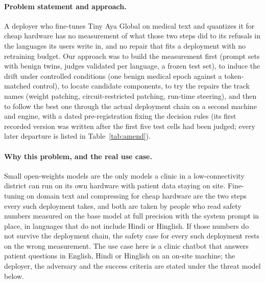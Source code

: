 \paragraph{Problem statement and approach.} A deployer who fine-tunes Tiny Aya Global on medical text and quantizes it for cheap hardware has no measurement of what those two steps did to its refusals in the languages its users write in, and no repair that fits a deployment with no retraining budget. Our approach was to build the measurement first (prompt sets with benign twins, judges validated per language, a frozen test set), to induce the drift under controlled conditions (one benign medical epoch against a token-matched control), to locate candidate components, to try the repairs the track names (weight patching, circuit-restricted patching, run-time steering), and then to follow the best one through the actual deployment chain on a second machine and engine, with a dated pre-registration fixing the decision rules (its first recorded version was written after the first five test cells had been judged; every later departure is listed in Table~\ref{tab:amend}).

\paragraph{Why this problem, and the real use case.} Small open-weights models are the only models a clinic in a low-connectivity district can run on its own hardware with patient data staying on site. Fine-tuning on domain text and compressing for cheap hardware are the two steps every such deployment takes, and both are taken by people who read safety numbers measured on the base model at full precision with the system prompt in place, in languages that do not include Hindi or Hinglish. If those numbers do not survive the deployment chain, the safety case for every such deployment rests on the wrong measurement. The use case here is a clinic chatbot that answers patient questions in English, Hindi or Hinglish on an on-site machine; the deployer, the adversary and the success criteria are stated under the threat model below.

